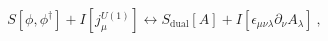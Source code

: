 \begin{equation}
S[\phi ,\phi ^{\dagger }]+I[j_{\mu }^{U(1)}]\leftrightarrow S_{\mathrm{dual}%
}[A]+I[\epsilon _{\mu \nu \lambda }\partial _{\nu }A_{\lambda }]\ ,
\label{udual}
\end{equation}

